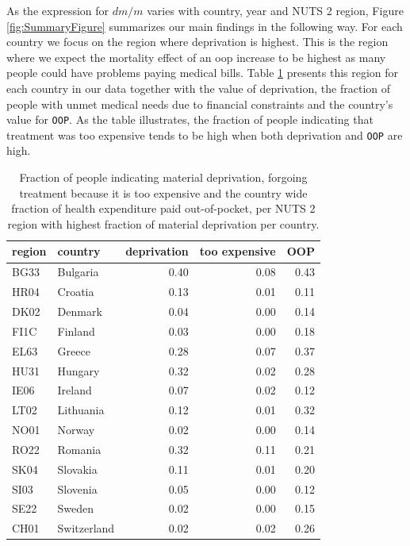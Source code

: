 \documentclass[a4paper,12pt]{article}
\begin{document}
As the expression for \(dm/m\) varies with country, year and NUTS 2 region, Figure \ref{fig:SummaryFigure} summarizes our main findings in the following way. For each country we focus on the region where deprivation is highest. This is the region where we expect the mortality effect of an oop increase to be highest as many people could have problems paying medical bills. Table \ref{tab:region_per_country} presents this region for each country in our data together with the value of deprivation, the fraction of people with unmet medical needs due to financial constraints and the country's value for \texttt{OOP}. As the table illustrates, the fraction of people indicating that treatment was too expensive tends to be high when both deprivation and \texttt{OOP} are high.


\begin{table}[htbp]
\caption{\label{tab:region_per_country}Fraction of people indicating material deprivation, forgoing treatment because it is too expensive and the country wide fraction of health expenditure paid out-of-pocket, per NUTS 2 region with highest fraction of material deprivation per country.}
\centering
\begin{tabular}{llrrr}
region & country & deprivation & too expensive & OOP\\[0pt]
\hline
BG33 & Bulgaria & 0.40 & 0.08 & 0.43\\[0pt]
HR04 & Croatia & 0.13 & 0.01 & 0.11\\[0pt]
DK02 & Denmark & 0.04 & 0.00 & 0.14\\[0pt]
FI1C & Finland & 0.03 & 0.00 & 0.18\\[0pt]
EL63 & Greece & 0.28 & 0.07 & 0.37\\[0pt]
HU31 & Hungary & 0.32 & 0.02 & 0.28\\[0pt]
IE06 & Ireland & 0.07 & 0.02 & 0.12\\[0pt]
LT02 & Lithuania & 0.12 & 0.01 & 0.32\\[0pt]
NO01 & Norway & 0.02 & 0.00 & 0.14\\[0pt]
RO22 & Romania & 0.32 & 0.11 & 0.21\\[0pt]
SK04 & Slovakia & 0.11 & 0.01 & 0.20\\[0pt]
SI03 & Slovenia & 0.05 & 0.00 & 0.12\\[0pt]
SE22 & Sweden & 0.02 & 0.00 & 0.15\\[0pt]
CH01 & Switzerland & 0.02 & 0.02 & 0.26\\[0pt]
\end{tabular}
\end{table}
\end{document}
